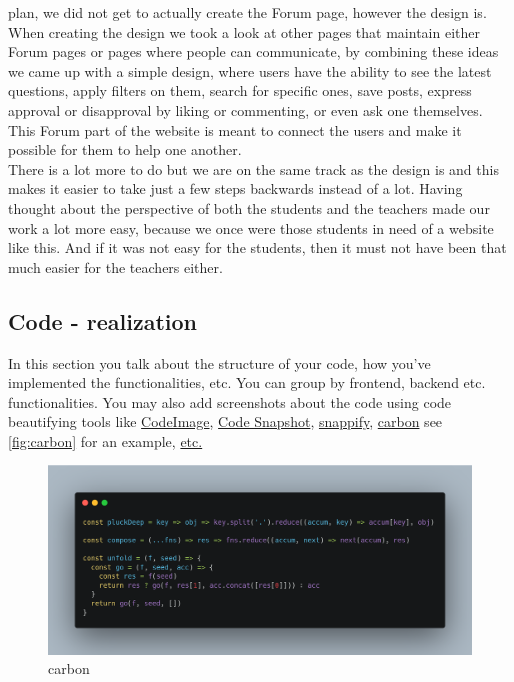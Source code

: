 \documentclass[12pt,a4paper]{article}
\begin{document}
\begin{spacing}{1.5}
    plan, we did not get to actually create the Forum page, however the design is.
    When creating the design we took a look at other pages that maintain either
    Forum pages or pages where people can communicate, by combining these ideas we
    came up with a simple design, where users have the ability to see the latest
    questions, apply filters on them, search for specific ones, save posts, express
    approval or disapproval by liking or commenting, or even ask one themselves.
    This Forum part of the website is meant to connect the users and make it
    possible for them to help one another. \\ \indent There is a lot more to do but
    we are on the same track as the design is and this makes it easier to take just
    a few steps backwards instead of a lot. Having thought about the perspective of
    both the students and the teachers made our work a lot more easy, because we
    once were those students in need of a website like this. And if it was not easy
    for the students, then it must not have been that much easier for the teachers
    either.

    \subsection{Code - realization}

    In this section you talk about the structure of your code, how you've
    implemented the functionalities, etc. You can group by frontend, backend etc.
    functionalities. You may also add screenshots about the code using code
    beautifying tools like \href{https://codeimage.dev/}{CodeImage},
    \href{https://marketplace.visualstudio.com/items?itemName=robertz.code-snapshot}{Code
        Snapshot}, \href{https://snappify.com/}{snappify},
    \href{https://carbon.now.sh/}{carbon} see \autoref{fig:carbon} for an example,
    \href{https://vigowebs.medium.com/awesome-5-tools-to-create-beautiful-images-of-your-code-snippets-2c2df02c6ae2}{etc.}

    \begin{figure}[H]
        \centering
        \includegraphics[width=0.9\linewidth]{assets/carbon.png}
        \caption{carbon}
        \label{fig:carbon}
    \end{figure}
    \FloatBarrier


\end{spacing}
\end{document}
